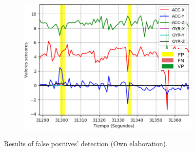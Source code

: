 \begin{figure}[H]
{\begin{varwidth}{\textwidth}
\begin{subfigure}[h]{0.45\textwidth}
            \includegraphics[width=\textwidth]{imagenes/Cap5/fp3}
        \end{subfigure} 
        \end{varwidth}}
        \caption{Results of false positives' detection (Own elaboration).}
		\label{fig:resultados_falsos_positivos}
    \end{figure}


 
 